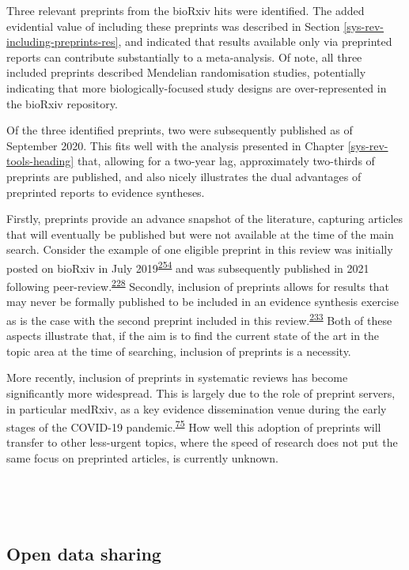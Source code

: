 \documentclass[a4paper, twoside]{templates/ociamthesis}
\begin{document}
Three relevant preprints from the bioRxiv hits were identified. The added evidential value of including these preprints was described in Section \ref{sys-rev-including-preprints-res}, and indicated that results available only via preprinted reports can contribute substantially to a meta-analysis. Of note, all three included preprints described Mendelian randomisation studies, potentially indicating that more biologically-focused study designs are over-represented in the bioRxiv repository.

Of the three identified preprints, two were subsequently published as of September 2020. This fits well with the analysis presented in Chapter \ref{sys-rev-tools-heading} that, allowing for a two-year lag, approximately two-thirds of preprints are published, and also nicely illustrates the dual advantages of preprinted reports to evidence syntheses.

Firstly, preprints provide an advance snapshot of the literature, capturing articles that will eventually be published but were not available at the time of the main search. Consider the example of one eligible preprint in this review was initially posted on bioRxiv in July 2019\textsuperscript{\protect\hyperlink{ref-andrews2019b}{254}} and was subsequently published in 2021 following peer-review.\textsuperscript{\protect\hyperlink{ref-andrews2021}{228}} Secondly, inclusion of preprints allows for results that may never be formally published to be included in an evidence synthesis exercise as is the case with the second preprint included in this review.\textsuperscript{\protect\hyperlink{ref-so2017}{233}} Both of these aspects illustrate that, if the aim is to find the current state of the art in the topic area at the time of searching, inclusion of preprints is a necessity.

More recently, inclusion of preprints in systematic reviews has become significantly more widespread. This is largely due to the role of preprint servers, in particular medRxiv, as a key evidence dissemination venue during the early stages of the COVID-19 pandemic.\textsuperscript{\protect\hyperlink{ref-fraser2020preprinting}{75}} How well this adoption of preprints will transfer to other less-urgent topics, where the speed of research does not put the same focus on preprinted articles, is currently unknown.

~

~

\hypertarget{sys-rev-open-data}{%
\subsection{Open data sharing}\label{sys-rev-open-data}}
\end{document}
